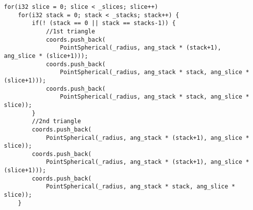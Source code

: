 \begin{lstlisting}
for(i32 slice = 0; slice < _slices; slice++)
    for(i32 stack = 0; stack < _stacks; stack++) {
        if(! (stack == 0 || stack == stacks-1)) {
            //1st triangle
            coords.push_back(
                PointSpherical(_radius, ang_stack * (stack+1), ang_slice * (slice+1)));
            coords.push_back(
                PointSpherical(_radius, ang_stack * stack, ang_slice * (slice+1)));
            coords.push_back(
                PointSpherical(_radius, ang_stack * stack, ang_slice * slice));
        }
        //2nd triangle
        coords.push_back(
            PointSpherical(_radius, ang_stack * (stack+1), ang_slice * slice));
        coords.push_back(
            PointSpherical(_radius, ang_stack * (stack+1), ang_slice * (slice+1)));
        coords.push_back(
            PointSpherical(_radius, ang_stack * stack, ang_slice * slice));
    }
\end{lstlisting}
